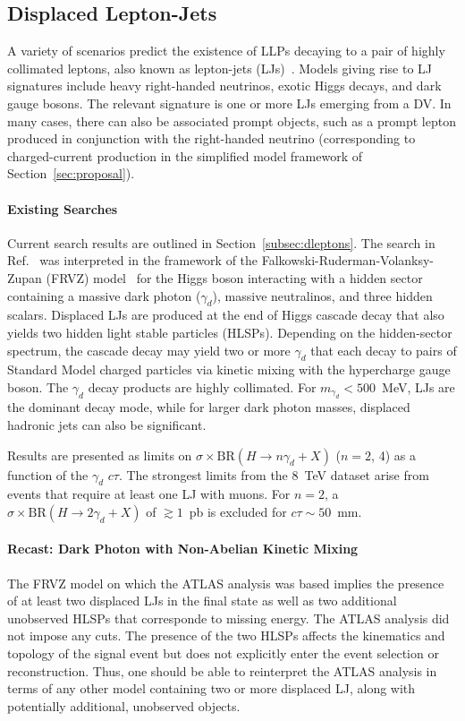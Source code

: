 \subsection{Displaced Lepton-Jets}

A variety of scenarios predict the existence of LLPs decaying to a pair of highly collimated leptons, also known as lepton-jets (LJs)~\cite{ArkaniHamed:2008qp}. Models giving rise to LJ signatures include heavy right-handed neutrinos, exotic Higgs decays, and dark gauge bosons. The relevant signature is one or more LJs emerging from a DV. In many cases, there can also be associated prompt objects, such as a prompt lepton produced in conjunction with the right-handed neutrino (corresponding to charged-current production in the simplified model framework of Section~\ref{sec:proposal}).

\paragraph {Existing Searches} Current search results are outlined in Section~\ref{subsec:dleptons}. The search in Ref.~\cite{ATLAS-CONF-2016-042} was interpreted in the framework of the Falkowski-Ruderman-Volanksy-Zupan (FRVZ) model~\cite{Falkowski:2010cm} for the Higgs boson interacting with a hidden sector containing a massive dark photon ($\gamma_d$), massive neutralinos, and three hidden scalars. Displaced LJs are produced at the end of Higgs cascade decay that also yields two hidden light stable particles (HLSPs). Depending on the hidden-sector spectrum, the cascade decay may yield two or more $\gamma_d$ that each decay to pairs of Standard Model charged particles via kinetic mixing with the hypercharge gauge boson. The $\gamma_d$ decay products are highly collimated. For $m_{\gamma_d} < 500$~MeV, LJs are the dominant decay mode, while for larger dark photon masses, displaced hadronic jets can also be significant.

Results are presented as limits on $\sigma\times \mathrm{BR}(H\to n\gamma_d+X)$ ($n=2$, 4) as a function of the $\gamma_d$ $c\tau$. The strongest limits from the 8~TeV dataset arise from events that require at least one LJ with muons. For $n=2$, a $\sigma\times \mathrm{BR}(H\to 2\gamma_d+X)$ of $\gtrsim1$~pb is excluded for $c\tau\sim 50$~mm.

\paragraph {Recast: Dark Photon with Non-Abelian Kinetic Mixing} The FRVZ model on which the ATLAS analysis was based implies the presence of at least two displaced LJs in the final state as well as two additional unobserved HLSPs that corresponde to missing energy. The ATLAS analysis did not impose any \MET cuts. The presence of the two HLSPs affects the kinematics and topology of the signal event but does not explicitly enter the event selection or reconstruction. Thus, one should be able to reinterpret the ATLAS analysis in terms of any other model containing two or more displaced LJ, along with potentially additional, unobserved objects.

